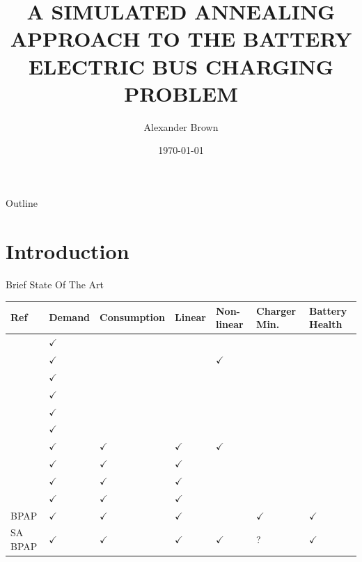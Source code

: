 \documentclass[aspectratio=169]{beamer}
\institute[USU] %
{
College of Engineering\\
Utah State University
}
\author{Alexander Brown}
\date{\today}
\title{A SIMULATED ANNEALING APPROACH TO THE BATTERY ELECTRIC BUS CHARGING PROBLEM}
\begin{document}
\maketitle
\begin{frame}{Outline}
\tableofcontents
\end{frame}


\section{Introduction}
\label{sec:org1a1c9ad}
\begin{frame}[label={sec:org1ec24b6}]{Brief State Of The Art}
{\scriptsize
\begin{center}
\begin{tabularx}{\textwidth}{XXXXXXX}
\hline
Ref & Demand & Consumption & Linear & Non-linear & Charger Min. & Battery Health\\[0pt]
\hline
\cite{zhou-2020-bi-objec} & \(\checkmark\) &  &  &  &  & \\[0pt]
\cite{whitaker-2023-a-network} & \(\checkmark\) &  &  & \(\checkmark\) &  & \\[0pt]
\cite{zhou-2020-bi-objec} & \(\checkmark\) &  &  &  &  & \\[0pt]
\cite{zhou-2020-collab-optim} & \(\checkmark\) &  &  &  &  & \\[0pt]
\cite{duan-2021-refor-mixed} & \(\checkmark\) &  &  &  &  & \\[0pt]
\cite{rinaldi-2020-mixed-fleet} & \(\checkmark\) &  &  &  &  & \\[0pt]
\cite{jahic-2019-preem} & \(\checkmark\) & \(\checkmark\) & \(\checkmark\) & \(\checkmark\) &  & \\[0pt]
\cite{frendo-2021-open-sourc} & \(\checkmark\) & \(\checkmark\) & \(\checkmark\) &  &  & \\[0pt]
\cite{qin-2016-numer-analy} & \(\checkmark\) & \(\checkmark\) & \(\checkmark\) &  &  & \\[0pt]
\cite{mortensen-2023-cost-minim} & \(\checkmark\) & \(\checkmark\) & \(\checkmark\) &  &  & \\[0pt]
BPAP & \(\checkmark\) & \(\checkmark\) & \(\checkmark\) &  & \(\checkmark\) & \(\checkmark\)\\[0pt]
SA BPAP & \(\checkmark\) & \(\checkmark\) & \(\checkmark\) & \(\checkmark\) & ? & \(\checkmark\)\\[0pt]
\hline
\end{tabularx}
\end{center}
}
\end{frame}
\end{document}
